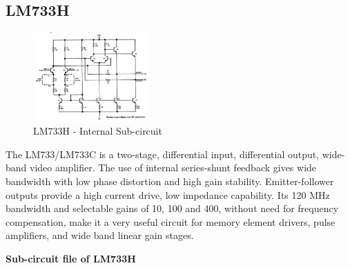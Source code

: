 \documentclass[12pt,a4paper]{report}
\begin{document}
\subsection{LM733H}
\begin{figure} %
	\centering
	\includegraphics[width=0.4\textwidth]{lm733h_sub}
	\caption{LM733H - Internal Sub-circuit}
\end{figure}
The LM733/LM733C is a two-stage, differential input, differential output, wide-band video amplifier. The use of internal series-shunt feedback gives wide bandwidth with low phase distortion and high gain stability. Emitter-follower outputs provide a high current drive, low impedance capability. Its 120 MHz bandwidth and selectable gains of 10, 100 and 400, without need for frequency compensation, make it a very useful circuit for memory element drivers, pulse amplifiers, and wide band linear gain stages.
\vspace{5mm}
\\
\begin{flushleft}
	\textbf{Sub-circuit file of LM733H}
\end{flushleft}
\end{document}
